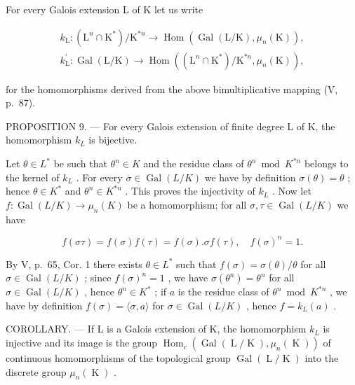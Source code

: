 For every Galois extension L of K let us write

\[
\begin{array}{l} k _ {\mathrm{L}} \colon (\mathrm{L} ^ {n} \cap \mathrm{K} ^ {*}) / \mathrm{K} ^ {* n} \to \operatorname{Hom} \left(\operatorname{Gal} (\mathrm{L} / \mathrm{K}),   \mu_ {n} (\mathrm{K})\right), \\ k _ {\mathrm{L}} ^ {\prime} \colon \operatorname{Gal} (\mathrm{L} / \mathrm{K}) \to \operatorname{Hom} \left((\mathrm{L} ^ {n} \cap \mathrm{K} ^ {*}) / \mathrm{K} ^ {* n},   \mu_ {n} (\mathrm{K})\right), \end{array}
\]

for the homomorphisms derived from the above bimultiplicative mapping (V, p.~87).

PROPOSITION 9. --- For every Galois extension of finite degree L of K, the homomorphism \(k_{L}\) is bijective.

Let \(\theta \in L^{*}\) be such that \(\theta^n \in K\) and the residue class of \(\theta^n \bmod K^{*n}\) belongs to the kernel of \(k_{L}\) . For every \(\sigma \in \operatorname{Gal}(L/K)\) we have by definition \(\sigma(\theta) = \theta\) ; hence \(\theta \in K^{*}\) and \(\theta^n \in K^{*n}\) . This proves the injectivity of \(k_{L}\) . Now let \(f: \operatorname{Gal}(L/K) \to \mu_n(K)\) be a homomorphism; for all \(\sigma, \tau \in \operatorname{Gal}(L/K)\) we have

\[
f (\sigma \tau) = f (\sigma) f (\tau) = f (\sigma). \sigma f (\tau), \quad f (\sigma) ^ {n} = 1.
\]

By V, p.~65, Cor. 1 there exists \(\theta \in L^{*}\) such that \(f(\sigma) = \sigma(\theta)/\theta\) for all \(\sigma \in \operatorname{Gal}(L/K)\) ; since \(f(\sigma)^{n} = 1\) , we have \(\sigma(\theta^{n}) = \theta^{n}\) for all \(\sigma \in \operatorname{Gal}(L/K)\) , hence \(\theta^{n} \in K^{*}\) ; if \(a\) is the residue class of \(\theta^{n} \bmod K^{*n}\) , we have by definition \(f(\sigma) = \langle \sigma, a \rangle\) for \(\sigma \in \operatorname{Gal}(L/K)\) , hence \(f = k_{L}(a)\) .

COROLLARY. --- If L is a Galois extension of K, the homomorphism \(k_{L}\) is injective and its image is the group \(\operatorname{Hom}_{c}(\operatorname{Gal}(\operatorname{L}/\operatorname{K}), \mu_{n}(\operatorname{K}))\) of continuous homomorphisms of the topological group \(\operatorname{Gal}(\operatorname{L}/\operatorname{K})\) into the discrete group \(\mu_{n}(\operatorname{K})\) .

